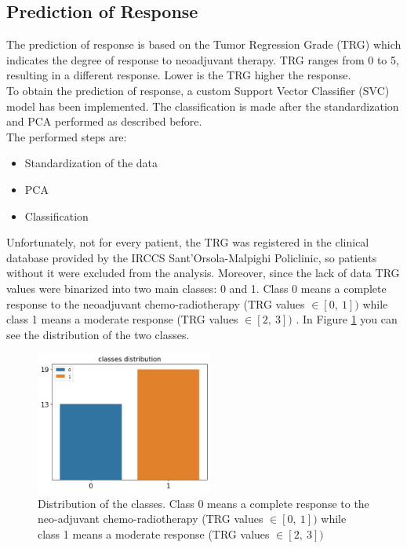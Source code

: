 \documentclass{standalone}
\begin{document}
\subsection{Prediction of Response}

The prediction of response is based on the Tumor Regression Grade (TRG) which indicates the degree of response to neoadjuvant therapy\cite{tesicoppola}. TRG ranges from 0 to 5, resulting in a different response. Lower is the TRG higher the response. 
\\
To obtain the prediction of response, a custom Support Vector Classifier (SVC) model has been implemented.
The classification is made after the standardization and PCA performed as described before.
\\
The performed steps are:

\begin{itemize}
    \item Standardization of the data
    \item PCA 
    \item Classification
\end{itemize}

Unfortunately, not for every patient, the TRG was registered in the clinical database provided by the IRCCS Sant'Orsola-Malpighi Policlinic, so patients without it were excluded from the analysis.
Moreover, since the lack of data TRG values were binarized into two main classes: 0 and 1.
Class 0 means a complete response to the neoadjuvant chemo-radiotherapy (TRG values $ \in [0, \: 1])$ while class 1 means a moderate response (TRG values $ \in [2, \: 3])$ .
In Figure \ref{classesdistrib} you can see the distribution of the two classes.

\begin{figure}[ht]

    \centering
    \includegraphics[width=0.52\textwidth]{../images/classesdistrib.png}

    \caption{Distribution of the classes. Class 0 means a complete response to the neo-adjuvant chemo-radiotherapy (TRG values $ \in [0, \: 1])$ while class 1 means a moderate response (TRG values $ \in [2, \: 3])$ }
    \label{classesdistrib}
    
    \end{figure}
\end{document}
